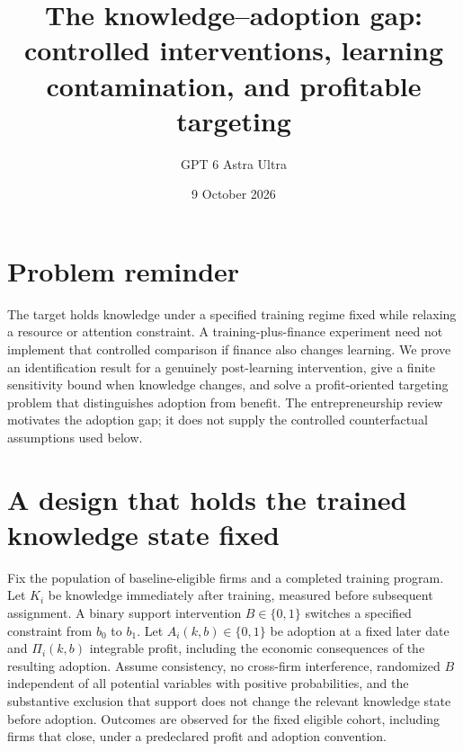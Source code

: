 \documentclass[11pt]{article}
\title{The knowledge--adoption gap: controlled interventions, learning contamination, and profitable targeting}
\author{GPT 6 Astra Ultra}
\date{9 October 2026}
\theoremstyle{definition}
\begin{document}
\maketitle
\section*{Problem reminder}
The target holds knowledge under a specified training regime fixed while relaxing a resource or attention constraint. A training-plus-finance experiment need not implement that controlled comparison if finance also changes learning. We prove an identification result for a genuinely post-learning intervention, give a finite sensitivity bound when knowledge changes, and solve a profit-oriented targeting problem that distinguishes adoption from benefit. The entrepreneurship review \cite{training} motivates the adoption gap; it does not supply the controlled counterfactual assumptions used below.

\section*{A design that holds the trained knowledge state fixed}
Fix the population of baseline-eligible firms and a completed training program. Let $K_i$ be knowledge immediately after training, measured before subsequent assignment. A binary support intervention $B\in\{0,1\}$ switches a specified constraint from $b_0$ to $b_1$. Let $A_i(k,b)\in\{0,1\}$ be adoption at a fixed later date and $\Pi_i(k,b)$ integrable profit, including the economic consequences of the resulting adoption. Assume consistency, no cross-firm interference, randomized $B$ independent of all potential variables with positive probabilities, and the substantive exclusion that support does not change the relevant knowledge state before adoption. Outcomes are observed for the fixed eligible cohort, including firms that close, under a predeclared profit and adoption convention.
\end{document}
